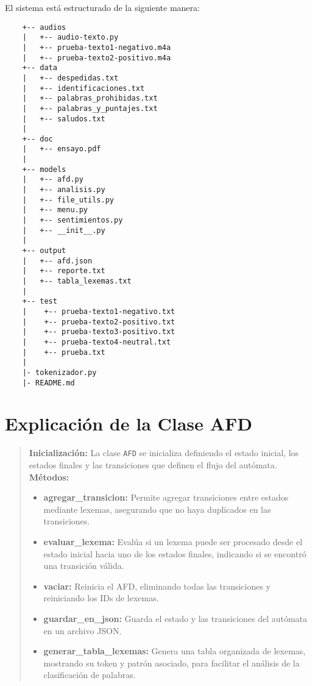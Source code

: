 \documentclass[12pt,a4paper]{article}
\begin{document}
El sistema está estructurado de la siguiente manera:
\begin{tcolorbox}[colback=gray!10, colframe=gray!80, sharp corners, boxrule=0.5pt]
	\begin{verbatim}
    +-- audios
    |   +-- audio-texto.py
    |   +-- prueba-texto1-negativo.m4a
    |   +-- prueba-texto2-positivo.m4a
    +-- data
    |   +-- despedidas.txt
    |   +-- identificaciones.txt
    |   +-- palabras_prohibidas.txt
    |   +-- palabras_y_puntajes.txt
    |   +-- saludos.txt
    |
    +-- doc
    |   +-- ensayo.pdf
    |
    +-- models
    |   +-- afd.py
    |   +-- analisis.py
    |   +-- file_utils.py
    |   +-- menu.py
    |   +-- sentimientos.py
    |   +-- __init__.py
    |
    +-- output
    |   +-- afd.json
    |   +-- reporte.txt
    |   +-- tabla_lexemas.txt
    |
    +-- test
    |    +-- prueba-texto1-negativo.txt
    |    +-- prueba-texto2-positivo.txt
    |    +-- prueba-texto3-positivo.txt
    |    +-- prueba-texto4-neutral.txt
    |    +-- prueba.txt
    |
    |- tokenizador.py
    |- README.md

\end{verbatim}
\end{tcolorbox}
\newpage


\section*{Explicación de la Clase AFD}
\begin{quote}
	\textbf{Inicialización:} La clase \texttt{AFD} se inicializa definiendo el estado inicial, los estados finales y las transiciones que definen el flujo del autómata.\\
	\textbf{Métodos:}
	\begin{itemize}
		\item \textbf{agregar\_transicion:} Permite agregar transiciones entre estados mediante lexemas, asegurando que no haya duplicados en las transiciones.
		\item \textbf{evaluar\_lexema:} Evalúa si un lexema puede ser procesado desde el estado inicial hacia uno de los estados finales, indicando si se encontró una transición válida.
		\item \textbf{vaciar:} Reinicia el AFD, eliminando todas las transiciones y reiniciando los IDs de lexemas.
		\item \textbf{guardar\_en\_json:} Guarda el estado y las transiciones del autómata en un archivo JSON.
		\item \textbf{generar\_tabla\_lexemas:} Genera una tabla organizada de lexemas, mostrando su token y patrón asociado, para facilitar el análisis de la clasificación de palabras.
	\end{itemize}
\end{quote}
\end{document}
